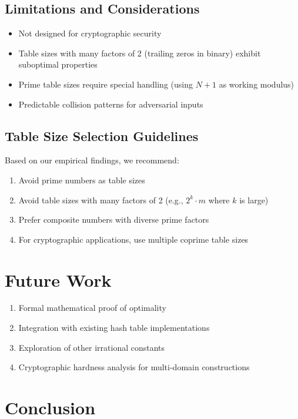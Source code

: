\documentclass[11pt,a4paper]{article}
\theoremstyle{definition}
\begin{document}
\subsection{Limitations and Considerations}

\begin{itemize}
\item Not designed for cryptographic security
\item Table sizes with many factors of 2 (trailing zeros in binary) exhibit suboptimal properties
\item Prime table sizes require special handling (using $N+1$ as working modulus)
\item Predictable collision patterns for adversarial inputs
\end{itemize}

\subsection{Table Size Selection Guidelines}

Based on our empirical findings, we recommend:
\begin{enumerate}
\item Avoid prime numbers as table sizes
\item Avoid table sizes with many factors of 2 (e.g., $2^k \cdot m$ where $k$ is large)
\item Prefer composite numbers with diverse prime factors
\item For cryptographic applications, use multiple coprime table sizes
\end{enumerate}

\section{Future Work}

\begin{enumerate}
\item Formal mathematical proof of optimality
\item Integration with existing hash table implementations
\item Exploration of other irrational constants
\item Cryptographic hardness analysis for multi-domain constructions
\end{enumerate}

\section{Conclusion}
\end{document}
